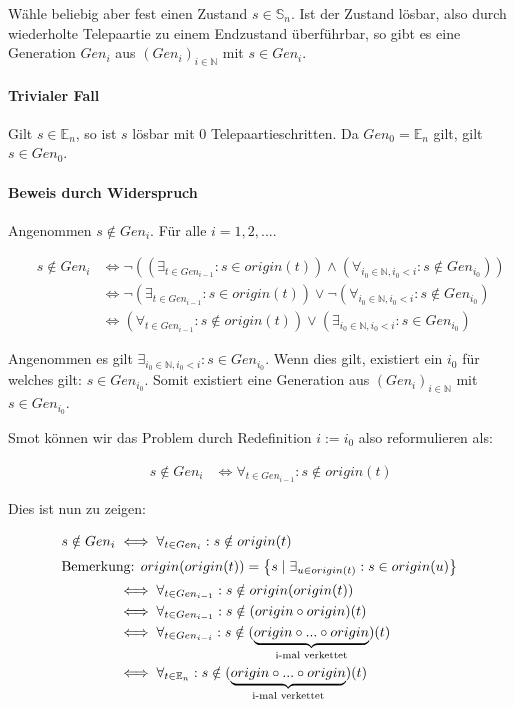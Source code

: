 \documentclass[a4paper,10pt,ngerman]{scrartcl}
\begin{document}
Wähle beliebig aber fest einen Zustand \(s\in\mathbb{S}_n\).
Ist der Zustand lösbar, also durch wiederholte Telepaartie zu einem Endzustand überführbar, so gibt es eine Generation \(Gen_i\) aus \((Gen_i)_{i\in\mathbb{N}}\) mit \(s\in Gen_i\).

\paragraph{Trivialer Fall}
Gilt \(s\in\mathbb{E}_n\), so ist \(s\) lösbar mit 0 Telepaartieschritten. Da \(Gen_0 = \mathbb{E}_n\) gilt, gilt \(s \in Gen_0\).

\paragraph{Beweis durch Widerspruch}

Angenommen \(s \notin Gen_{i}\). Für alle \(i=1,2,...\).

\begin{align*}
    &&s \notin Gen_{i} &\iff \lnot\left(\left(\exists_{t \in Gen_{i-1}} : s \in origin(t)\right) \land \left(\forall_{i_0\in\mathbb{N}, i_0 < i}: s \notin Gen_{i_0}\right)\right) \\
    && &\iff \lnot\left(\exists_{t \in Gen_{i-1}} : s \in origin(t)\right) \lor \lnot\left(\forall_{i_0\in\mathbb{N}, i_0 < i}: s \notin Gen_{i_0}\right) \\
    && &\iff \left(\forall_{t \in Gen_{i-1}} : s \notin origin(t)\right) \lor \left(\exists_{i_0\in\mathbb{N}, i_0 < i}: s \in Gen_{i_0}\right)
\end{align*}

Angenommen es gilt \(\exists_{i_0\in\mathbb{N}, i_0 < i}: s \in Gen_{i_0}\). Wenn dies gilt, existiert ein \(i_0\) für welches gilt: \(s \in Gen_{i_0}\). Somit existiert eine Generation aus \((Gen_i)_{i\in\mathbb{N}}\) mit \(s \in Gen_{i_0}\).

Smot können wir das Problem durch Redefinition \(i := i_0\) also reformulieren als:

\begin{align*}
    &&s \notin Gen_{i} 
    &\iff \forall_{t \in Gen_{i-1}} : s \notin origin(t)
\end{align*}

Dies ist nun zu zeigen:

\begin{align*}
    s \notin Gen_{i}
    &\iff \forall_{t \in Gen_i} : s \notin origin(t) \\
    \intertext{Bemerkung: \(origin(origin(t)) = \left\{ s \mid \exists_{u \in origin(t)} : s \in origin(u) \right\}\)}
    &\iff \forall_{t \in Gen_{i-1}} : s \notin origin(origin(t)) \\
    &\iff \forall_{t \in Gen_{i-1}} : s \notin (origin \circ origin)(t) \\
    &\iff \forall_{t \in Gen_{i-i}} : s \notin (\underbrace{origin \circ ... \circ origin}_{\text{i-mal verkettet}})(t) \\
    &\iff \forall_{t \in \mathbb{E}_n} : s \notin (\underbrace{origin \circ ... \circ origin}_{\text{i-mal verkettet}})(t) \\
\end{align*}
\end{document}

